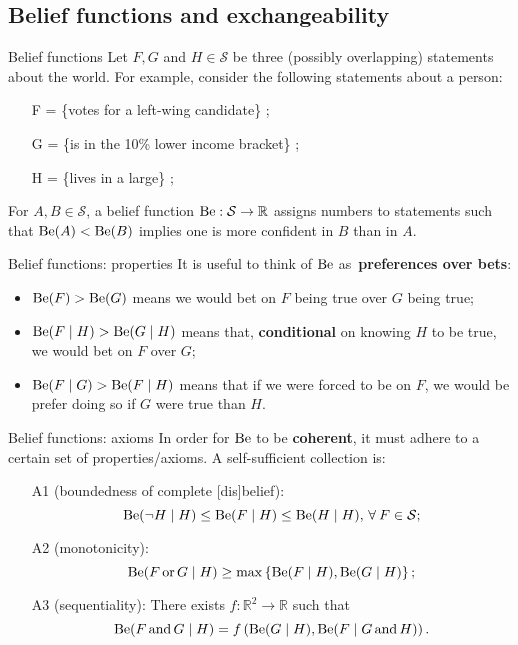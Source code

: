\subsection{Belief functions and exchangeability}
\begin{frame}{Belief functions}
Let $F, G$ and $H \in \mathcal{S}$ be three (possibly overlapping) statements about the world.
For example, consider the following statements about a person:
\begin{itemize}
 \item [F] = \{votes for a left-wing candidate\} ;
 \item [G] = \{is in the 10\% lower income bracket\} ;
 \item [H] = \{lives in a large\} ;
\end{itemize}

 \begin{defn}
 \label{def:belief_function} 
 For $A, B \in \mathcal{S}$, a belief function $\operatorname{Be} : \mathcal{S} \to \mathbb{R}$ assigns numbers to statements such that $\operatorname{Be}(A) < \operatorname{Be}(B)$ implies one is more confident in $B$ than in $A$.
 \end{defn}
\end{frame}
\begin{frame}{Belief functions: properties}
It is useful to think of $\operatorname{Be}$ as~\textbf{preferences over bets}:
 \begin{itemize}
  \item $\operatorname{Be}(F) > \operatorname{Be}(G)$ means we would bet on $F$ being true over $G$ being true;
  \item $\operatorname{Be}(F\mid H) > \operatorname{Be}(G \mid H)$ means that, \textbf{conditional} on knowing $H$ to be true, we would bet on $F$ over $G$;
  \item $\operatorname{Be}(F\mid G) > \operatorname{Be}(F \mid H)$ means that if we were forced to be on $F$, we would be prefer doing so if $G$ were true than $H$.
 \end{itemize}
\end{frame}
\begin{frame}{Belief functions: axioms}
 In order for $\operatorname{Be}$ to be \textbf{coherent}, it must adhere to a certain set of properties/axioms.
 A self-sufficient collection is:
 \begin{itemize}
  \item [A1]  (boundedness of complete [dis]belief): $$\operatorname{Be}(\lnot H \mid H) \leq \operatorname{Be}(F \mid H) \leq \operatorname{Be}(H \mid H),\, \forall\: F \in \mathcal{S};$$
  \item [A2]  (monotonicity):
  $$\operatorname{Be}(F \, \text{or} \, G \mid H) \geq \max \left\{ \operatorname{Be}(F \mid H), \operatorname{Be}(G \mid H) \right\};$$
  \item [A3] (sequentiality): There exists $f: \mathbb{R}^2 \to \mathbb{R}$ such that
  $$ \operatorname{Be}(F\, \text{and} \, G \mid H) = f\left(\operatorname{Be}(G\mid H), \operatorname{Be}(F \mid G\, \text{and} \, H) \right).$$
 \end{itemize}
\end{frame}
